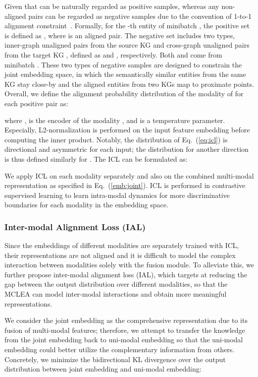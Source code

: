 \documentclass[11pt]{article}
\begin{document}
Given that  can be naturally regarded as positive samples, whereas any non-aligned pairs can be regarded as negative samples due to the convention of 1-to-1 alignment constraint~\cite{sun2018bootstrapping}. 
Formally, for the -th entity  of minibatch , the positive set is defined as , where  is an aligned pair.
The negative set includes two types, inner-graph unaligned pairs from the source KG  and cross-graph unaligned pairs from the target KG , defined as  and , respectively.
Both  and  come from minibatch .
These two types of negative samples are designed to constrain the joint embedding space, in which  the semantically similar entities from the same KG stay close-by and the aligned entities from two KGs map to proximate points. 
Overall, we define the alignment probability distribution  of the modality of  for each positive pair  as:

where ,  is the encoder of the modality , and  is a temperature parameter.
Especially, L2-normalization is performed on the input feature embedding before computing the inner product.
Notably, the distribution of Eq.~(\ref{eq:icl}) is directional and asymmetric for each input; the distribution for another direction is thus defined similarly for . 
The ICL can be formulated as:



We apply ICL on each modality separately and also on the combined multi-modal representation as specified in Eq.~(\ref{emb:joint}).
ICL is performed in contrastive supervised learning to learn intra-modal dynamics for more discriminative boundaries for each modality in the embedding space. 


\subsubsection{Inter-modal Alignment Loss (IAL)}

Since the embeddings of different modalities are separately trained with ICL, their representations are not aligned and it is difficult to model the complex interaction between modalities solely with the fusion module.
To alleviate this, we further propose inter-modal alignment loss (IAL), which targets at reducing the gap between the output distribution over different modalities, so that the MCLEA can model inter-modal interactions and obtain more meaningful representations.

We consider the joint embedding as the comprehensive representation due to its fusion of multi-modal features; therefore, we attempt to transfer the knowledge from the joint embedding back to uni-modal embedding so that the uni-modal embedding could better utilize the complementary information from others.
Concretely, we minimize the bidirectional KL divergence over the output distribution between joint embedding and uni-modal embedding:
\end{document}

